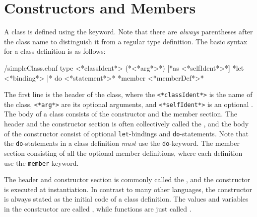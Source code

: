 \documentclass[fsharpNotes.tex]{subfiles}
\begin{document}
\section{Constructors and Members}
\label{sec:constructor}
A class is defined using the  keyword. Note that there are \emph{always} parentheses after the class name to distinguish it from a regular type definition. The basic syntax for a class definition is as follows:%
%
\begin{verbatimwrite}{\ebnf/simpleClass.ebnf}
type <*classIdent*> ({*<*arg*>*}) [*as <*selfIdent*>*] 
  {*let <*binding*> |* do <*statement*>*}
  {*member <*memberDef*>*}
\end{verbatimwrite}
%
The first line is the header of the class, where the \lstinline[language=syntax]{<*classIdent*>} is the name of the class, \lstinline[language=syntax]{<*arg*>} are its optional arguments, and \lstinline[language=syntax]{<*selfIdent*>} is an optional . The body of a class consists of the constructor and the member section. The header and the constructor section is often collectively called the , and the body of the constructor consist of optional \lstinline{let}-bindings and \lstinline{do}-statements. Note that the \lstinline{do}-statements in a class definition \emph{must} use the \lstinline{do}-keyword. The member section consisting of all the optional member definitions, where each definition use the \lstinline{member}-keyword.


The header and constructor section is commonly called the , and the constructor is executed at instantiation. In contrast to many other languages, the constructor is always stated as the initial code of a class definition.
The values and variables in the constructor are called , while functions are just called .
\end{document}
